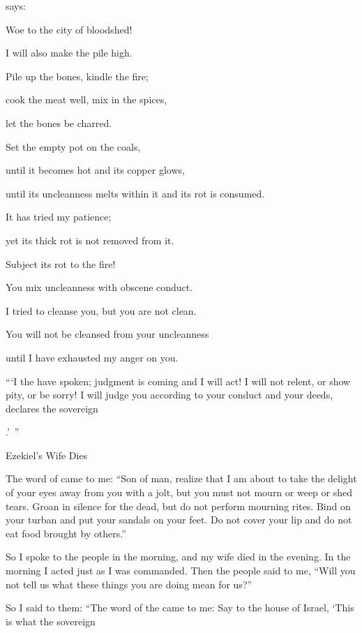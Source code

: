 {{}
says:
\par }{\Q Woe
to the city
of bloodshed!
\par }{\Q I
will also
make
the pile high.
\par }{\Q {}Pile up
the bones,
kindle
the fire;
\par }{\Q cook
the meat
well, mix in the spices,
\par }{\Q let the bones
be charred.
\par }{\Q {}Set
the empty
pot on
the coals,
\par }{\Q until it becomes hot
and its copper
glows,
\par }{\Q until its uncleanness
melts
within
it and its rot
is consumed.
\par }{\Q {}It has tried
my patience;
\par }{\Q yet its thick
rot
is not
removed
from
it.
\par }{\Q Subject its rot
to the fire!
\par }{\Q {}You mix uncleanness
with obscene
conduct.
\par }{\Q I tried to cleanse
you, but you are not clean.
\par }{\Q You will not
be cleansed
from your uncleanness
\par }{\Q until
I have exhausted
my anger on you.
\par }{\PP {}“‘I
the {}
have spoken;
judgment is coming
and I will act! I will not
relent,
or
show pity,
or
be sorry! I will judge
you according to your conduct
and your deeds,
declares
the sovereign

{}.’ ”
\par }{\SH Ezekiel’s Wife Dies
\par }{\PP {}The word
of
{}
came to me:
“Son
of man,
realize
that I am about to take
the delight
of your eyes
away from you with a jolt,
but you must not
mourn
or
weep
or
shed
tears.
Groan
in silence
for the dead,
but do not
perform
mourning
rites.
Bind on
your turban
and put
your sandals
on your feet.
Do not
cover
your lip
and do not
eat
food
brought by others.”
\par }{\PP {}So I spoke
to
the people
in the morning,
and my wife
died
in the evening.
In the morning
I acted
just
as I was commanded.
Then the people
said
to me,
“Will you not
tell
us what
these
things you
are doing
mean for us?”
\par }{\PP {}So I said
to
them: “The word
of the {}
came to me:
Say
to the house
of Israel,
‘This is what
the sovereign

}
